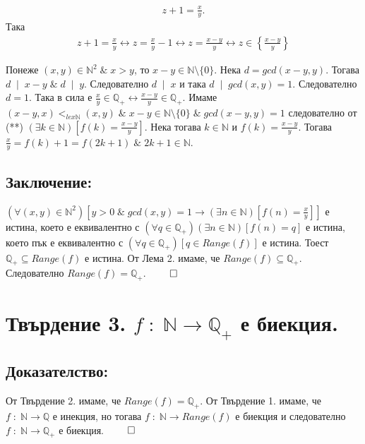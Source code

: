 \documentclass[a4paper, 12pt, oneside]{article}
\begin{document}
\begin{itemize}
\begin{itemize}
    \begin{align*}
        z + 1 = \displaystyle\frac{x}{y}.
    \end{align*}
    Така
    \begin{align*}
        z + 1 = \displaystyle\frac{x}{y} \longleftrightarrow
        z = \displaystyle\frac{x}{y} - 1 \longleftrightarrow
        z = \displaystyle\frac{x - y}{y} \longleftrightarrow
        z \in \left\{\displaystyle\frac{x - y}{y}\right\}
    \end{align*}
    \end{itemize}
    Понеже \((x, y) \in \mathbb{N}^2 \; \& \; x > y\), то \(x - y \in \mathbb{N} \setminus \{0\}\).
    Нека \(d = gcd(x - y, y)\). Тогава \(d \; \mid \; x - y \; \& \; d \; \mid \; y\).
    Следователно \(d \; \mid \; x\) и така \(d \; \mid \; gcd(x, y) = 1\).
    Следователно \(d = 1\). Така в сила е \(\displaystyle\frac{x}{y} \in \mathbb{Q}_+ \longleftrightarrow \displaystyle\frac{x - y}{y} \in \mathbb{Q}_+\).
    Имаме \\
    \((x - y, x) <_{lex\mathbb{N}} (x, y) \; \& \; x - y \in \mathbb{N} \setminus \{0\} \; \& \; gcd(x - y, y) = 1\)
    следователно от (**) \((\exists k \in \mathbb{N})\left[f(k) = \displaystyle\frac{x - y}{y}\right]\).
    Нека тогава \(k \in \mathbb{N}\) и \(f(k) = \displaystyle\frac{x - y}{y}\).
    Тогава \(\displaystyle\frac{x}{y} = f(k) + 1 = f(2k + 1) \; \& \; 2k + 1 \in \mathbb{N}\).
\end{itemize}
\subsection*{Заключение:}
\((\forall (x, y) \in \mathbb{N}^2)\left[y > 0 \; \& \; gcd(x, y) = 1 \longrightarrow (\exists n \in \mathbb{N})\left[f(n) = \displaystyle\frac{x}{y}\right]\right]\)
е истина, което е еквивалентно с \((\forall q \in \mathbb{Q}_+)(\exists n \in \mathbb{N})[f(n) = q]\) е истина,
което пък е еквивалентно с \((\forall q \in \mathbb{Q}_+)[q \in Range(f)]\) е истина.
Тоест \(\mathbb{Q}_+ \subseteq Range(f)\) е истина.
От Лема 2. имаме, че \(Range(f) \subseteq \mathbb{Q}_+\).
Следователно \(Range(f) = \mathbb{Q}_+\). \(\qed\)
\section*{Твърдение 3. \(f \; : \; \mathbb{N} \to \mathbb{Q}_+\) е биекция.}
\subsection*{Доказателство:}
От Твърдение 2. имаме, че \(Range(f) = \mathbb{Q}_+\). От Твърдение 1. имаме, че \\
\(f \; : \; \mathbb{N} \to \mathbb{Q}\) е инекция,
но тогава \(f \; : \; \mathbb{N} \to Range(f)\) е биекция и следователно
\(f \; : \; \mathbb{N} \to \mathbb{Q}_+\) е биекция. \(\qed\)
\end{document}
